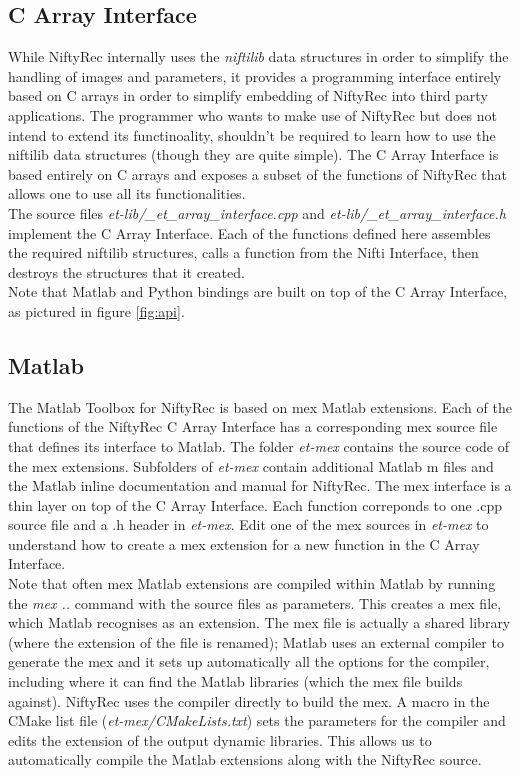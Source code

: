 \documentclass[12pt,a4paper]{report}
\begin{document}
\subsection{C Array Interface}
While NiftyRec internally uses the \emph{niftilib} data structures in order to simplify the handling of images and parameters, 
it provides a programming interface entirely based on C arrays in order to simplify embedding of NiftyRec into third party applications. 
The programmer who wants to make use of NiftyRec but does not intend to extend its functinoality, shouldn't 
be required to learn how to use the niftilib data structures (though they are quite simple). The C Array Interface is based entirely on 
C arrays and exposes a subset of the functions of NiftyRec that allows one to use all its functionalities. \\

The source files \emph{et-lib/\_et\_array\_interface.cpp} and \emph{et-lib/\_et\_array\_interface.h} implement the C Array Interface. 
Each of the functions defined here assembles the required niftilib structures, calls a function from the Nifti Interface, then destroys the structures that 
it created. \\

Note that Matlab and Python bindings are built on top of the C Array Interface, as pictured in figure \ref{fig:api}.

\subsection{Matlab}
The Matlab Toolbox for NiftyRec is based on mex Matlab extensions. 
Each of the functions of the NiftyRec C Array Interface has a corresponding mex source file that 
defines its interface to Matlab. The folder \emph{et-mex} contains the source code of the mex extensions. 
Subfolders of \emph{et-mex} contain additional Matlab m files and the Matlab inline documentation and manual for NiftyRec.
The mex interface is a thin layer on top of the C Array Interface. Each function correponds to one .cpp source file and a .h header 
in \emph{et-mex}. Edit one of the mex sources in \emph{et-mex} to understand how to create a mex extension for a new function in the C Array Interface.\\

Note that often mex Matlab extensions are compiled within Matlab by running the \emph{mex ..} command with the source files as parameters. This creates a mex file, which 
Matlab recognises as an extension. The mex file is actually a shared library (where the extension of the file is renamed); Matlab uses an external compiler to generate the mex 
and it sets up automatically all the options for the compiler, including where it can find the Matlab libraries (which the mex file builds against). NiftyRec uses the compiler 
directly to build the mex. A macro in the CMake list file (\emph{et-mex/CMakeLists.txt}) sets the parameters for the compiler and edits the extension of the output dynamic libraries. This allows us to automatically compile the Matlab extensions along with the NiftyRec source.
\end{document}
